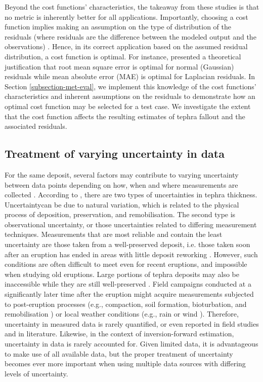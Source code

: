     Beyond the cost functions' characteristics, the takeaway from these studies is that no metric is inherently better for all applications. Importantly, choosing a cost function implies making an assumption on the type of distribution of the residuals (where residuals are the difference between the modeled output and the observations) \citep{engle1993limitations}. Hence, in its correct application based on the assumed residual distribution, a cost function is optimal. For instance, \cite{hodson2022root} presented a theoretical justification that root mean square error is optimal for normal (Gaussian) residuals while mean absolute error (MAE) is optimal for Laplacian residuals. In Section \ref{subsection-met-eval}, we implement this knowledge of the cost functions' characteristics and inherent assumptions on the residuals to demonstrate how an optimal cost function may be selected for a test case. We investigate the extent that the cost function affects the resulting estimates of tephra fallout and the associated residuals. 

 
\subsection{Treatment of varying uncertainty in data} \label{subsection-tephra2-uncertainty}
    For the same deposit, several factors may contribute to varying uncertainty between data points depending on how, when and where measurements are collected \citep{engwell2013, bonadonna2015}. According to \cite{engwell2013}, there are two types of uncertainties in tephra thickness. Uncertaintycan be due to natural variation, which is related to the physical process of deposition, preservation, and remobilisation. The second type is observational uncertainty, or those uncertainties related to differing measurement techniques. Measurements that are most reliable and contain the least uncertainty are those taken from a  well-preserved deposit, i.e. those taken soon after an eruption has ended in areas with little deposit reworking \citep{PYLE201625, blong2017}. However, such conditions are often difficult to meet even for recent eruptions, and impossible when studying old eruptions. Large portions of tephra deposits may also be inaccessible while they are still well-preserved \citep{walker1971characteristics}. Field campaigns conducted at a significantly later time after the eruption might acquire measurements subjected to post-eruption processes (e.g., compaction, soil formation, bioturbation, and remobilisation \citep{engwell2013}) or local weather conditions (e.g., rain or wind \citep{hayes2002, wilson2011, arnalds2013, blong2017, oishi2018, dominguez2020}). Therefore, uncertainty in measured data is rarely quantified, or even reported in field studies and in literature. Likewise, in the context of inversion-forward estimation, uncertainty in data is rarely accounted for. Given limited data, it is advantageous to make use of all available data, but the proper treatment of uncertainty becomes ever more important when using multiple data sources with differing levels of uncertainty.

